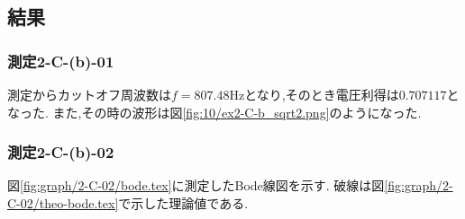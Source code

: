 \subsection{結果}
\subsubsection{測定2-C-(b)-01}
測定からカットオフ周波数は$f=807.48\si{\hertz}$となり,そのとき電圧利得は$0.707117$となった.
また,その時の波形は図\ref{fig:10/ex2-C-b_sqrt2.png}のようになった.
\subsubsection{測定2-C-(b)-02}
図\ref{fig:graph/2-C-02/bode.tex}に測定したBode線図を示す.
破線は図\ref{fig:graph/2-C-02/theo-bode.tex}で示した理論値である.
